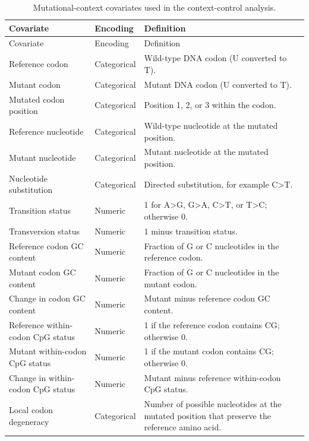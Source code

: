 \begin{longtable}{p{} p{} p{}}
\caption{Mutational-context covariates used in the context-control analysis.}\label{tab:context_covariates}\\
\toprule
Covariate & Encoding & Definition \\
\midrule
\endfirsthead
\toprule
Covariate & Encoding & Definition \\
\midrule
\endhead
Reference codon & Categorical & Wild-type DNA codon (U converted to T). \\
Mutant codon & Categorical & Mutant DNA codon (U converted to T). \\
Mutated codon position & Categorical & Position 1, 2, or 3 within the codon. \\
Reference nucleotide & Categorical & Wild-type nucleotide at the mutated position. \\
Mutant nucleotide & Categorical & Mutant nucleotide at the mutated position. \\
Nucleotide substitution & Categorical & Directed substitution, for example C>T. \\
Transition status & Numeric & 1 for A>G, G>A, C>T, or T>C; otherwise 0. \\
Transversion status & Numeric & 1 minus transition status. \\
Reference codon GC content & Numeric & Fraction of G or C nucleotides in the reference codon. \\
Mutant codon GC content & Numeric & Fraction of G or C nucleotides in the mutant codon. \\
Change in codon GC content & Numeric & Mutant minus reference codon GC content. \\
Reference within-codon CpG status & Numeric & 1 if the reference codon contains CG; otherwise 0. \\
Mutant within-codon CpG status & Numeric & 1 if the mutant codon contains CG; otherwise 0. \\
Change in within-codon CpG status & Numeric & Mutant minus reference within-codon CpG status. \\
Local codon degeneracy & Categorical & Number of possible nucleotides at the mutated position that preserve the reference amino acid. \\
\bottomrule
\end{longtable}
